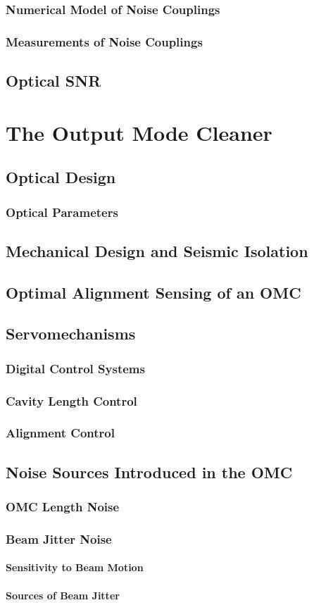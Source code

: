 \subsection{Numerical Model of Noise Couplings}
\subsection{Measurements of Noise Couplings}
\section{Optical SNR}

\chapter{The Output Mode Cleaner}
\section{Optical Design}
\subsection{Optical Parameters}
\section{Mechanical Design and Seismic Isolation}
\section{Optimal Alignment Sensing of an OMC}
\section{Servomechanisms}
\subsection{Digital Control Systems}
\subsection{Cavity Length Control}
\subsection{Alignment Control}
\section{Noise Sources Introduced in the OMC}
\subsection{OMC Length Noise}
\subsection{Beam Jitter Noise}
\subsubsection{Sensitivity to Beam Motion}
\subsubsection{Sources of Beam Jitter}
